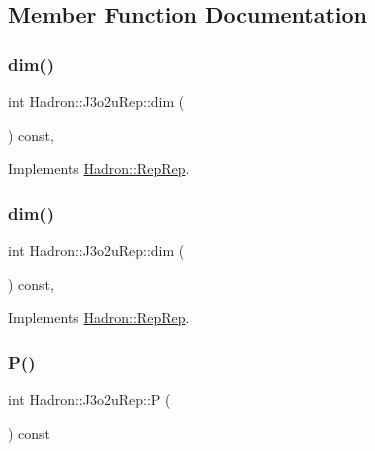 \subsection{Member Function Documentation}
\mbox{\label{structHadron_1_1J3o2uRep_a02d95a2eb65dcc65b2e8904496fbe0b4}} 
\subsubsection{\texorpdfstring{dim()}{dim()}\hspace{0.1cm}{\footnotesize\ttfamily [1/2]}}
{\footnotesize\ttfamily int Hadron\+::\+J3o2u\+Rep\+::dim (\begin{DoxyParamCaption}{ }\end{DoxyParamCaption}) const\hspace{0.3cm}{\ttfamily [inline]}, {\ttfamily [virtual]}}



Implements \mbox{\hyperlink{structHadron_1_1RepRep_a92c8802e5ed7afd7da43ccfd5b7cd92b}{Hadron\+::\+Rep\+Rep}}.

\mbox{\label{structHadron_1_1J3o2uRep_a02d95a2eb65dcc65b2e8904496fbe0b4}} 
\subsubsection{\texorpdfstring{dim()}{dim()}\hspace{0.1cm}{\footnotesize\ttfamily [2/2]}}
{\footnotesize\ttfamily int Hadron\+::\+J3o2u\+Rep\+::dim (\begin{DoxyParamCaption}{ }\end{DoxyParamCaption}) const\hspace{0.3cm}{\ttfamily [inline]}, {\ttfamily [virtual]}}



Implements \mbox{\hyperlink{structHadron_1_1RepRep_a92c8802e5ed7afd7da43ccfd5b7cd92b}{Hadron\+::\+Rep\+Rep}}.

\mbox{\label{structHadron_1_1J3o2uRep_a9e81ffb5181e3276f1e607a3fa90d62a}} 
\subsubsection{\texorpdfstring{P()}{P()}\hspace{0.1cm}{\footnotesize\ttfamily [1/2]}}
{\footnotesize\ttfamily int Hadron\+::\+J3o2u\+Rep\+::P (\begin{DoxyParamCaption}{ }\end{DoxyParamCaption}) const\hspace{0.3cm}{\ttfamily [inline]}}

